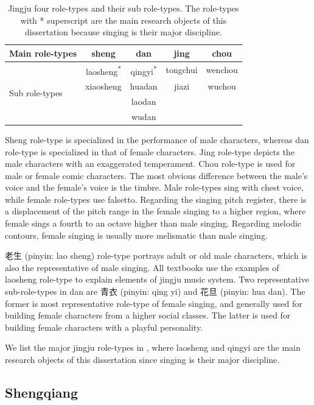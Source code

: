 \begin{table}[ht!]
\centering
\begin{tabular}{l|cccc}
\toprule
Main role-types & sheng               & dan                           & jing & chou \\
\midrule
\multirow{4}{*}{Sub role-types} & laosheng\textsuperscript{*} & qingyi\textsuperscript{*} & tongchui    & wenchou   \\
& xiaosheng & huadan & jiazi & wuchou \\
&&laodan&& \\
&&wudan&& \\
\bottomrule
\end{tabular}
\caption{Jingju four role-types and their sub role-types. The role-types with * superscript are the main research objects of this dissertation because singing is their major discipline.}
\label{tab:role-types}
\end{table}

Sheng role-type is specialized in the performance of male characters, whereas dan role-type is specialized in that of female characters. Jing role-type depicts the male characters with an exaggerated temperament. Chou role-type is used for male or female comic characters. The most obvious difference between the male’s voice and the female’s voice is the timbre. Male role-types sing with chest voice, while female role-types use falsetto. Regarding the singing pitch register, there is a displacement of the pitch range in the female singing to a higher region, where female sings a fourth to an octave higher than male singing. Regarding melodic contours, female singing is usually more melismatic than male singing. 

老生 (pinyin: lao sheng) role-type portrays adult or old male characters, which is also the representative of male singing. All textbooks use the examples of laosheng role-type to explain elements of jingju music system. Two representative sub-role-types in dan are 青衣 (pinyin: qing yi) and 花旦 (pinyin: hua dan). The former is most representative role-type of female singing, and generally used for building female characters from a higher social classes. The latter is used for building female characters with a playful personality.

We list the major jingju role-types in , where laosheng and qingyi are the main research objects of this dissertation since singing is their major discipline.

\subsection{Shengqiang}

